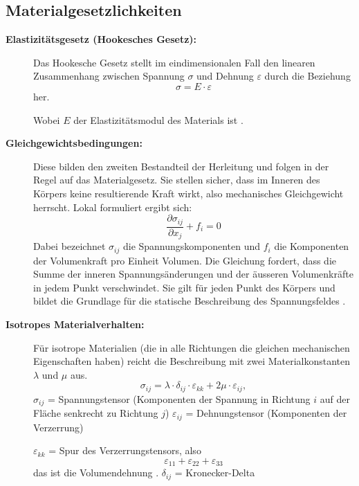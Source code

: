 \subsection{Materialgesetzlichkeiten}
\begin{description}	
	\item[\textbf{Elastizitätsgesetz (Hookesches Gesetz):}] Das Hookesche Gesetz stellt im eindimensionalen Fall den linearen Zusammenhang zwischen Spannung $\sigma$ und Dehnung $\varepsilon$ durch die Beziehung 
	\begin{equation}
		\sigma = 
		E \cdot \varepsilon
	\end{equation}
	 her.
	 
	 Wobei $E$ der Elastizitätsmodul des Materials ist \cite{elastomechanik:Kontinuumsmechanik}.
	 \item[\textbf{Gleichgewichtsbedingungen:}] Diese bilden den zweiten Bestandteil der Herleitung und folgen in der Regel auf das Materialgesetz. 
	 Sie stellen sicher, dass im Inneren des Körpers keine resultierende Kraft wirkt, also mechanisches Gleichgewicht herrscht.
	 Lokal formuliert ergibt sich:
	 \begin{equation}
	 	\frac{\partial \sigma_{ij}}{\partial x_j} + f_i =
	 	0
	 \end{equation}
	 Dabei bezeichnet $\sigma_{ij}$ die Spannungskomponenten und $f_i$ die Komponenten der Volumenkraft pro Einheit Volumen. 
	 Die Gleichung fordert, dass die Summe der inneren Spannungsänderungen und der äusseren Volumenkräfte in jedem Punkt verschwindet. Sie gilt für jeden Punkt des Körpers und bildet die Grundlage für die statische Beschreibung des Spannungsfeldes \cite{elastomechanik:Grundlagen der Elastizitaetstheorie}.
	 \item[\textbf{Isotropes Materialverhalten:}] Für isotrope Materialien (die in alle Richtungen die gleichen mechanischen Eigenschaften haben) reicht die Beschreibung mit zwei Materialkonstanten $\lambda$ und $\mu$ aus.
	 \begin{equation}
	 	\sigma_{ij} = 
	 	\lambda \cdot \delta_{ij} \cdot \varepsilon_{kk} + 2\mu \cdot \varepsilon_{ij},
	 \end{equation}
	$\sigma_{ij}$ = Spannungstensor (Komponenten der Spannung in Richtung $i$ auf der Fläche senkrecht zu Richtung $j$)
	$\varepsilon_{ij}$ = Dehnungstensor (Komponenten der Verzerrung)
	
	$\varepsilon_{kk}$ = Spur des Verzerrungstensors, also
	\begin{equation}
		\varepsilon_{11} + \varepsilon_{22} + \varepsilon_{33}
	\end{equation}
	das ist die Volumendehnung \cite{elastomechanik:Grundlagen der Elastizitaetstheorie}.
	 $\delta_{ij}$ = Kronecker-Delta 
	 

\end{description}
